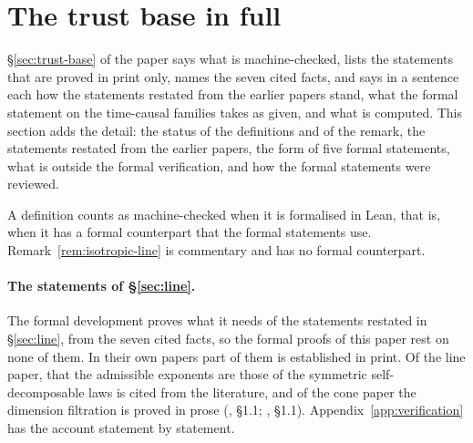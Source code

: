 \section{The trust base in full}\label{supp:trust}
\S\ref{sec:trust-base} of the paper says what is machine-checked, lists the statements that are
proved in print only, names the seven cited facts, and says in a sentence each how the
statements restated from the earlier papers stand, what the formal statement on the
time-causal families takes as given, and what is computed. This section adds the detail: the
status of the definitions and of the remark, the statements restated from the earlier papers,
the form of five formal statements, what is outside the formal verification, and how the formal
statements were reviewed.

A definition counts as
machine-checked when it is formalised in Lean, that is, when it has a formal counterpart that
the formal statements use.
Remark~\ref{rem:isotropic-line} is commentary and has no formal counterpart.

\paragraph{The statements of \S\ref{sec:line}.} The formal development proves what it needs of
the statements restated in \S\ref{sec:line}, from the seven cited facts, so the formal proofs of
this paper rest on none of them. In their own papers part of them is established in print. Of
the line paper, that the admissible exponents are those of the symmetric self-decomposable laws
is cited from the literature, and of the cone paper the dimension filtration is proved in prose
(, \S1.1; , \S1.1).
Appendix~\ref{app:verification} has the account statement by statement.

